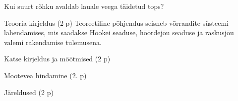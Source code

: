 
Kui suurt rõhku avaldab lauale veega täidetud tops?

\hint

\solu
Teooria kirjeldus (2 p) Teoreetiline pōhjendus seisneb vōrrandite süsteemi lahendamises, mis saadakse Hookei seaduse, hōōrdejōu seaduse ja raskusjōu valemi rakendamise tulemusena.

Katse kirjeldus ja mōōtmised (2 p)

Mōōtevea hindamine (2. p)

Järeldused (2 p)
\probend
